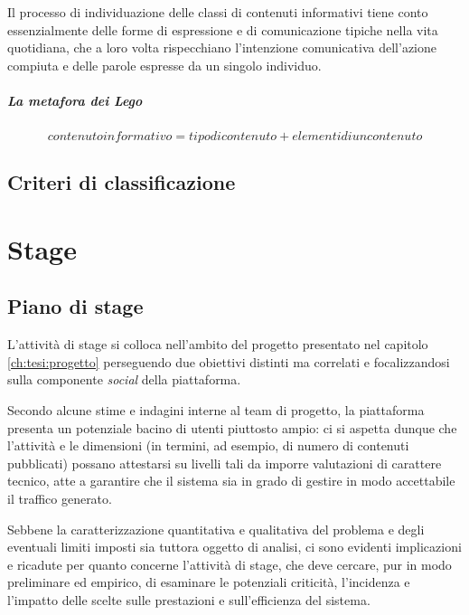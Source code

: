 \documentclass[11pt,a4paper,headsepline,hidelinks]{scrreprt} %
\begin{document}
	Il processo di individuazione delle classi di contenuti informativi tiene conto essenzialmente delle forme di espressione e di comunicazione tipiche nella vita quotidiana, che a loro volta rispecchiano l'intenzione comunicativa dell'azione compiuta e delle parole espresse da un singolo individuo.

  \paragraph{La metafora dei Lego}
  $$ contenuto informativo = tipo di contenuto + elementi di un contenuto $$

	\section{Criteri di classificazione}
	\label{sec:progetto:classificazione}	

	\chapter{Stage}
	\label{ch:tesi:stage}

	\section{Piano di stage}
	\label{sec:tesi:stage:piano}
		
	L'attività di stage si colloca nell'ambito del progetto presentato nel capitolo \ref{ch:tesi:progetto} perseguendo due obiettivi distinti ma correlati e focalizzandosi sulla componente \textit{social} della piattaforma.
	
		Secondo alcune stime e indagini interne al team di progetto, la piattaforma presenta un potenziale bacino di utenti piuttosto ampio: ci si aspetta dunque che l'attività e le dimensioni (in termini, ad esempio, di numero di contenuti pubblicati) possano attestarsi su livelli tali da imporre valutazioni di carattere tecnico, atte a garantire che il sistema sia in grado di gestire in modo accettabile il traffico generato.
		
		 Sebbene la caratterizzazione quantitativa e qualitativa del problema e degli eventuali limiti imposti sia tuttora oggetto di analisi, ci sono evidenti implicazioni e ricadute per quanto concerne l'attività di stage, che deve cercare, pur in modo preliminare ed empirico, di esaminare le potenziali criticità, l'incidenza e l'impatto delle scelte sulle prestazioni e sull'efficienza del sistema.
	
\end{document}
